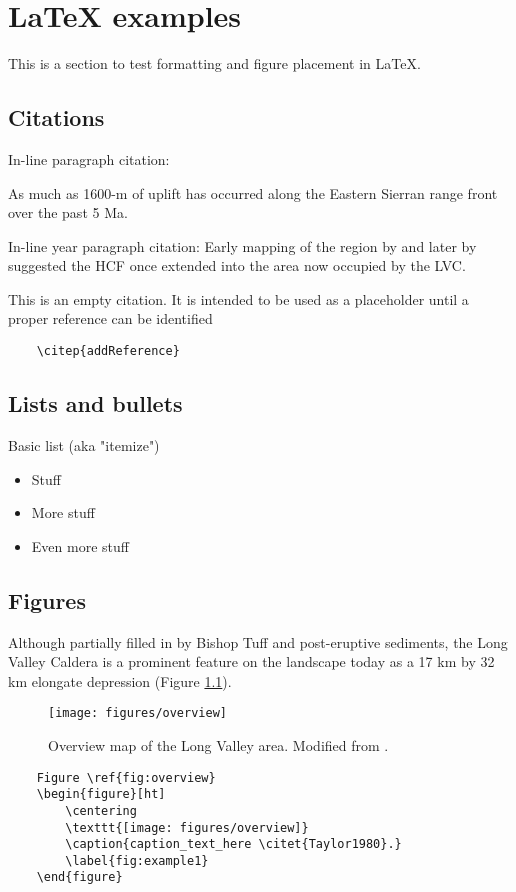 \documentclass[../main.tex]{subfiles}
\begin{document}

\chapter{LaTeX examples}

This is a section to test formatting and figure placement in LaTeX.
\section{Citations}
In-line paragraph citation:\par
As much as 1600-m of uplift has occurred along the Eastern Sierran range front \citep{Rinehart1964} over the past 5 Ma.

In-line year paragraph citation:
Early mapping of the region by \citet{Rinehart1964} and later by \citet{Bailey1974} suggested the HCF once extended into the area now occupied by the LVC.
\citep{Ponce2013}

This is an empty citation.  It is intended to be used as a placeholder until a proper reference can be identified \citep{addReference}
\begin{verbatim}
    \citep{addReference}
\end{verbatim}

\section{Lists and bullets}
Basic list (aka "itemize")\par
	\begin{itemize}
		\item Stuff
		\item More stuff
		\item Even more stuff
	\end{itemize}

\section{Figures}
Although partially filled in by Bishop Tuff and post-eruptive sediments, the Long Valley Caldera is a prominent feature on the landscape today as a 17 km by 32 km elongate depression (Figure \ref{fig:example1}).
\begin{figure}[ht]
	\centering
	\texttt{[image: figures/overview]}
	\caption{Overview map of the Long Valley area.  Modified from \citet{Taylor1980}.}
	\label{fig:example1}
\end{figure}
\begin{verbatim}
    Figure \ref{fig:overview}
    \begin{figure}[ht]
    	\centering
    	\texttt{[image: figures/overview]}
    	\caption{caption_text_here \citet{Taylor1980}.}
    	\label{fig:example1}
    \end{figure}
\end{verbatim}
\end{document}
